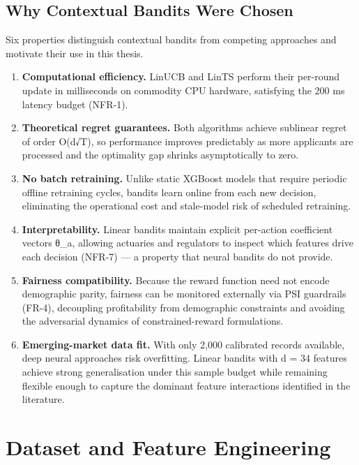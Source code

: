 \subsection{Why Contextual Bandits Were Chosen}\label{why-contextual-bandits-were-chosen}

Six properties distinguish contextual bandits from competing approaches and motivate their use in this thesis.

\begin{enumerate}
\def\labelenumi{\arabic{enumi}.}
\tightlist
\item
  \textbf{Computational efficiency.} LinUCB and LinTS perform their per-round update in milliseconds on commodity CPU hardware, satisfying the 200 ms latency budget (NFR-1).
\item
  \textbf{Theoretical regret guarantees.} Both algorithms achieve sublinear regret of order O(d√T), so performance improves predictably as more applicants are processed and the optimality gap shrinks asymptotically to zero.
\item
  \textbf{No batch retraining.} Unlike static XGBoost models that require periodic offline retraining cycles, bandits learn online from each new decision, eliminating the operational cost and stale-model risk of scheduled retraining.
\item
  \textbf{Interpretability.} Linear bandits maintain explicit per-action coefficient vectors θ\_a, allowing actuaries and regulators to inspect which features drive each decision (NFR-7) --- a property that neural bandits do not provide.
\item
  \textbf{Fairness compatibility.} Because the reward function need not encode demographic parity, fairness can be monitored externally via PSI guardrails (FR-4), decoupling profitability from demographic constraints and avoiding the adversarial dynamics of constrained-reward formulations.
\item
  \textbf{Emerging-market data fit.} With only 2,000 calibrated records available, deep neural approaches risk overfitting. Linear bandits with d = 34 features achieve strong generalisation under this sample budget while remaining flexible enough to capture the dominant feature interactions identified in the literature.
\end{enumerate}

\section{Dataset and Feature Engineering}\label{dataset-and-feature-engineering}


